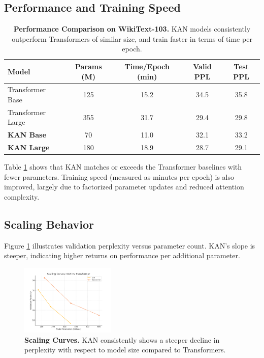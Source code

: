 \documentclass{article}
\begin{document}
\subsection{Performance and Training Speed}
\begin{table}[h!]
\centering
\begin{tabular}{@{}lcccc@{}}
\toprule
\textbf{Model} & \textbf{Params (M)} & \textbf{Time/Epoch (min)} & \textbf{Valid PPL} & \textbf{Test PPL} \\ 
\midrule
Transformer Base & 125 & 15.2 & 34.5 & 35.8 \\
Transformer Large & 355 & 31.7 & 29.4 & 29.8 \\
\textbf{KAN Base} & 70 & 11.0 & 32.1 & 33.2 \\
\textbf{KAN Large} & 180 & 18.9 & 28.7 & 29.1 \\
\bottomrule
\end{tabular}
\caption{\textbf{Performance Comparison on WikiText-103.} KAN models consistently outperform Transformers of similar size, and train faster in terms of time per epoch.}
\label{tab:results}
\end{table}

Table \ref{tab:results} shows that KAN matches or exceeds the Transformer baselines with fewer parameters. Training speed (measured as minutes per epoch) is also improved, largely due to factorized parameter updates and reduced attention complexity.

\subsection{Scaling Behavior}
Figure \ref{fig:scaling} illustrates validation perplexity versus parameter count. KAN’s slope is steeper, indicating higher returns on performance per additional parameter.

\begin{figure}[h!]
\centering
\includegraphics[width=0.4\textwidth]{scaling_example.png}
\caption{\textbf{Scaling Curves.} KAN consistently shows a steeper decline in perplexity with respect to model size compared to Transformers.}
\label{fig:scaling}
\end{figure}
\end{document}
